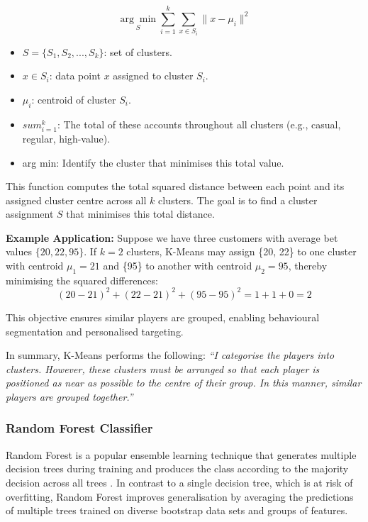 \documentclass[12pt,a4paper]{report}
\begin{document}
\begin{equation}
\underset{S}{\arg\min} \sum_{i=1}^{k} \sum_{x \in S_i} \| x - \mu_i \|^2
\end{equation}

\begin{itemize}
    \item \( S = \{S_1, S_2, ..., S_k\} \): set of clusters.
    \item \( x \in S_i \): data point \(x\) assigned to cluster \(S_i\).
    \item \( \mu_i \): centroid of cluster \(S_i\).
    \item \(sum_{i=1}^{k}\): The total of these accounts throughout all clusters (e.g., casual, regular, high-value).
    \item arg min: Identify the cluster that minimises this total value. 
\end{itemize}

This function computes the total squared distance between each point and its assigned cluster centre across all \(k\) clusters. The goal is to find a cluster assignment \(S\) that minimises this total distance.

\vspace{0.5em}
\textbf{Example Application:} Suppose we have three customers with average bet values \(\{20, 22, 95\}\). If \(k = 2\) clusters, K-Means may assign \{20, 22\} to one cluster with centroid \(\mu_1 = 21\) and \{95\} to another with centroid \(\mu_2 = 95\), thereby minimising the squared differences:
\[
(20 - 21)^2 + (22 - 21)^2 + (95 - 95)^2 = 1 + 1 + 0 = 2
\]

This objective ensures similar players are grouped, enabling behavioural segmentation and personalised targeting.

In summary, K-Means performs the following:
\textit{``I categorise the players into clusters. However, these clusters must be arranged so that each player is positioned as near as possible to the centre of their group. In this manner, similar players are grouped together.''}


\subsubsection{Random Forest Classifier}

Random Forest is a popular ensemble learning technique that generates multiple decision trees during training and produces the class according to the majority decision across all trees \citet{randomforest}.  In contrast to a single decision tree, which is at risk of overfitting, Random Forest improves generalisation by averaging the predictions of multiple trees trained on diverse bootstrap data sets and groups of features.
\end{document}
